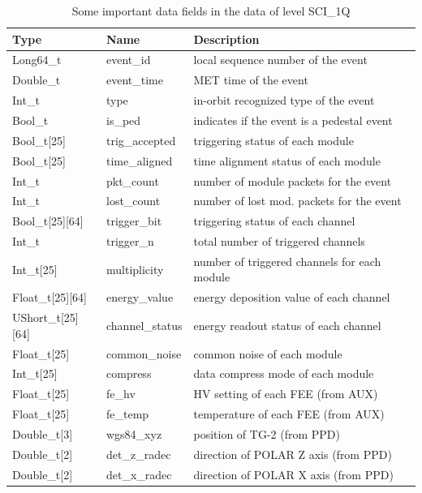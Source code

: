 \documentclass{raa}
\begin{document}
\begin{table}[!ht]
\centering
\small
\caption{Some important data fields in the data of level SCI\_1Q}\label{tab:sci_1q}
\begin{tabular}{|l|l|l|}\hline
Type\tablefootnote{\url{https://root.cern.ch/root/html528/ListOfTypes.html}} & Name & Description \\\hline\hline
Long64\_t & event\_id & local sequence number of the event \\\hline
Double\_t & event\_time & MET time of the event\\\hline
Int\_t & type & in-orbit recognized type of the event\\\hline
Bool\_t & is\_ped & indicates if the event is a pedestal event \\\hline
Bool\_t[25] & trig\_accepted & triggering status of each module \\\hline
Bool\_t[25] & time\_aligned & time alignment status of each module \\\hline
Int\_t & pkt\_count & number of module packets for the event \\\hline
Int\_t & lost\_count & number of lost mod. packets for the event \\\hline
Bool\_t[25][64] & trigger\_bit & triggering status of each channel \\\hline
Int\_t & trigger\_n & total number of triggered channels \\\hline
Int\_t[25] & multiplicity & number of triggered channels for each module \\\hline
Float\_t[25][64] & energy\_value & energy deposition value of each channel \\\hline
UShort\_t[25][64] & channel\_status & energy readout status of each channel \\\hline
Float\_t[25] & common\_noise & common noise of each module \\\hline
Int\_t[25] & compress & data compress mode of each module \\\hline
Float\_t[25] & fe\_hv & HV setting of each FEE (from AUX) \\\hline
Float\_t[25] & fe\_temp & temperature of each FEE (from AUX) \\\hline
Double\_t[3] & wgs84\_xyz & position of TG-2 (from PPD) \\\hline
Double\_t[2] & det\_z\_radec & direction of POLAR Z axis (from PPD) \\\hline
Double\_t[2] & det\_x\_radec & direction of POLAR X axis (from PPD) \\\hline
\end{tabular}
\end{table}
\end{document}
